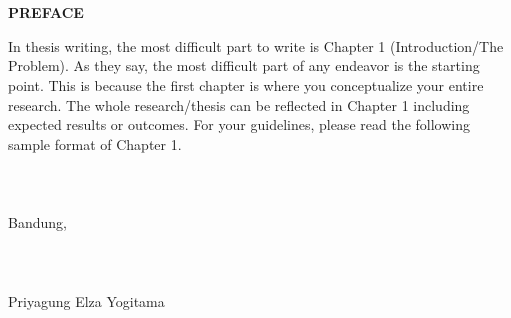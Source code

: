 \chapter*{}
\vspace*{-1.0cm}
\begin{center}
\normalfont\LARGE\textbf{PREFACE}
\end{center}
In thesis writing, the most difficult part to write is Chapter 1 (Introduction/The Problem). As they say, the most difficult part of any endeavor is the starting point. This is because the first chapter is where you conceptualize your entire research. The whole research/thesis can be reflected in Chapter 1 including expected results or outcomes. For your guidelines, please read the following sample format of Chapter 1.\\\\\\\\
Bandung,\\\\\\\\
Priyagung Elza Yogitama